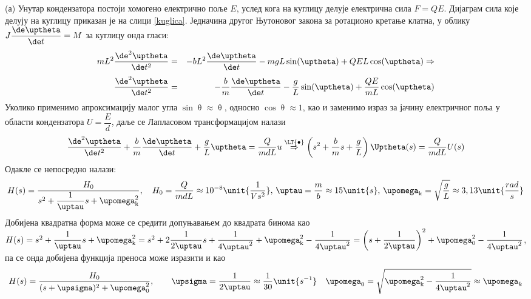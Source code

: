 \RESENJE
(а) Унутар кондензатора постоји хомогено електрично поље $E$, услед кога на куглицу 
делује електрична сила $F = QE$.
Дијаграм сила које делују на куглицу приказан је на слици \ref{kuglica}.
Једначина другог Њутоновог закона за ротационо кретање клатна, у облику $J \dfrac{\de\uptheta}{\de t} = M$ за
куглицу онда гласи:
\begin{eqnarray} 
    mL^2 \dfrac{\de^2 \uptheta}{\de t^2} &=& - b L^2 \dfrac{\de \uptheta}{\de t} - mgL\sin(\uptheta) + QE L\cos(\uptheta) \Rightarrow \\[1mm]
    \dfrac{\de^2 \uptheta}{\de t^2} &=& - \dfrac{b}{m}  \dfrac{\de \uptheta}{\de t} - \dfrac{g}{L} \sin(\uptheta) + \dfrac{QE}{mL}\cos(\uptheta)
\end{eqnarray}
Уколико применимо апроксимацију малог угла $\sin\uptheta \approx \uptheta$, односно $\cos \uptheta \approx 1$, као и заменимо 
израз за јачину електричног поља у области кондензатора $U = \dfrac{E}{d}$, даље се Лапласовом трансформацијом налази 
\begin{eqnarray}
    \dfrac{\de^2 \uptheta}{\de t^2} + \dfrac{b}{m}  \dfrac{\de \uptheta}{\de t} + \dfrac{g}{L} \uptheta =  \dfrac{Q}{mdL} u
    \overset{{\LT{\bullet}}}{ \Rightarrow } 
    \left(
        s^2 + \dfrac{b}{m} s +  \dfrac{g}{L}
    \right) \Uptheta(s) 
    =
    \dfrac{Q}{mdL} U(s)
\end{eqnarray}
Одакле се непосредно налази:
\begin{equation}
    H(s) = \dfrac{ H_0 }{s^2 + \dfrac{1}{\uptau} s + \upomega_{\rm k}^2}, \quad H_0 = \dfrac{Q}{mdL} \approx 10^{-8} \unit{\dfrac{1}{Vs^2}} ,\, \uptau = \dfrac{m}{b} 
    \approx 15\unit{s},\, \upomega_{\rm k} = \sqrt{\dfrac{g}{L}} \approx 3,13\unit{\dfrac{rad}{s}}
\end{equation}
Добијена квадратна форма може се средити допуњавањем до квадрата бинома као 
$ H(s) = s^2 + \dfrac{1}{\uptau} s + \upomega_{\rm k}^2 = s^2 + 2 \dfrac{1}{2\uptau} s + \dfrac{1}{4\uptau^2} + \upomega_{\rm k}^2 - \dfrac{1}{4\uptau^2} 
= \left( s + \dfrac{1}{2\uptau} \right)^2 +  \upomega_0^2 - \dfrac{1}{4\uptau^2}$, па се онда добијена функција преноса може изразити и као 
\begin{eqnarray}
    H(s) = \dfrac{H_0}{(s + \upsigma)^2 + \upomega_0^2}, \qquad \upsigma = \dfrac{1}{2\uptau} \approx \dfrac{1}{30} \unit{s^{-1}} \quad \upomega_0 = \sqrt{\upomega_{\rm k}^2 - \dfrac{1}{4\uptau^2} }
    \approx \upomega_k
\end{eqnarray}

